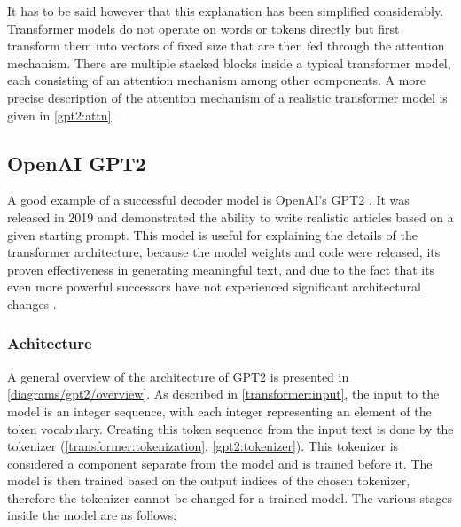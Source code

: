 It has to be said however that this explanation has been simplified considerably. Transformer models do not operate on words or tokens directly but first transform them into vectors of fixed size that are then fed through the attention mechanism. There are multiple stacked blocks inside a typical transformer model, each consisting of an attention mechanism among other components. A more precise description of the attention mechanism of a realistic transformer model is given in \cref{gpt2:attn}.

\subsection{OpenAI GPT2}

A good example of a successful decoder model is OpenAI's GPT2 \cite{unsupervisedmultitask} \cite{OpenAI2019BetterLM} \cite[source code]{HuggingFaceGPT2}. It was released in 2019 and demonstrated the ability to write realistic articles based on a given starting prompt. This model is useful for explaining the details of the transformer architecture, because the model weights and code were released, its proven effectiveness in generating meaningful text, and due to the fact that its even more powerful successors have not experienced significant architectural changes \cite{OpenGenus2023GPTComparison}.

\subsubsection{Achitecture}

A general overview of the architecture of GPT2 is presented in \cref{diagrams/gpt2/overview}.
As described in \cref{transformer:input}, the input to the model is an integer sequence, with each integer representing an element of the token vocabulary.
Creating this token sequence from the input text is done by the tokenizer (\cref{transformer:tokenization}, \cref{gpt2:tokenizer}). This tokenizer is considered a component separate from the model and is trained before it. The model is then trained based on the output indices of the chosen tokenizer, therefore the tokenizer cannot be changed for a trained model. The various stages inside the model are as follows:

